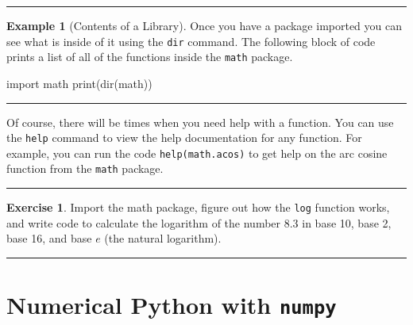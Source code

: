 \documentclass[
]{book}
\newenvironment{Shaded}{\begin{snugshade}}{\end{snugshade}}
\newcommand{\BuiltInTok}[1]{#1}
\newcommand{\ImportTok}[1]{#1}
\newcommand{\NormalTok}[1]{#1}
\theoremstyle{definition}
\theoremstyle{definition}
\newtheorem{example}{Example}[chapter]
\theoremstyle{definition}
\newtheorem{exercise}{Exercise}[chapter]
\theoremstyle{remark}
\begin{document}
\begin{center}\rule{0.5\linewidth}{0.5pt}\end{center}

\begin{example}[Contents of a Library]
\protect\hypertarget{exm:unnamed-chunk-705}{}{\label{exm:unnamed-chunk-705} {} }Once you have a package imported you can see what is inside of it using the \texttt{dir} command. The following block of code prints a list of all of the functions inside the \texttt{math} package.
\end{example}

\begin{Shaded}
\begin{Highlighting}[]
\ImportTok{import}\NormalTok{ math}
\BuiltInTok{print}\NormalTok{(}\BuiltInTok{dir}\NormalTok{(math))}
\end{Highlighting}
\end{Shaded}

\begin{center}\rule{0.5\linewidth}{0.5pt}\end{center}

Of course, there will be times when you need help with a function. You can use the \texttt{help} command to view the help documentation for any function. For example, you can run the code \texttt{help(math.acos)} to get help on the arc cosine function from the \texttt{math} package.

\begin{center}\rule{0.5\linewidth}{0.5pt}\end{center}

\begin{exercise}
\protect\hypertarget{exr:unnamed-chunk-707}{}{\label{exr:unnamed-chunk-707} }Import the math package, figure out how the \texttt{log} function works, and
write code to calculate the logarithm of the number 8.3 in base 10, base
2, base 16, and base \(e\) (the natural logarithm).
\end{exercise}

\begin{center}\rule{0.5\linewidth}{0.5pt}\end{center}

\hypertarget{numerical-python-with-numpy}{%
\section{\texorpdfstring{Numerical Python with \texttt{numpy}}{Numerical Python with numpy}}\label{numerical-python-with-numpy}}
\end{document}
